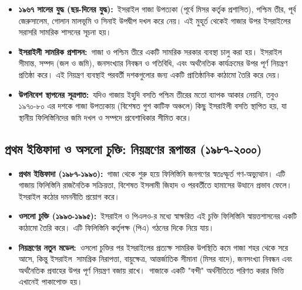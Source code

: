 \begin{itemize}
\item
  \textbf{১৯৬৭ সালের যুদ্ধ (ছয়-দিনের যুদ্ধ):}~ইসরাইল গাজা উপত্যকা (পূর্বে মিসর কর্তৃক প্রশাসিত), পশ্চিম তীর, পূর্ব জেরুসালেম, গোলান মালভূমি ও সিনাই উপদ্বীপ দখল করে নেয়। এই মুহূর্ত থেকেই গাজার উপর ইসরাইলের সরাসরি সামরিক শাসনের সূচনা হয়।
\item
  \textbf{ইসরাইলী সামরিক প্রশাসন:}~গাজা ও পশ্চিম তীরে একটি সামরিক সরকার ব্যবস্থা চালু করা হয়। ইসরাইল সীমান্ত, সম্পদ (জল ও জমি), জনসংখ্যার নিবন্ধন ও গতিবিধি, এবং অর্থনৈতিক কার্যক্রমের উপর পূর্ণ নিয়ন্ত্রণ প্রতিষ্ঠা করে। এই নিয়ন্ত্রণ ব্যবস্থাই পরবর্তী দশকগুলোর জন্য একটি প্রাতিষ্ঠানিক কাঠামো তৈরি করে দেয়।
\item
  \textbf{উপনিবেশ স্থাপনের সূত্রপাত:}~যদিও গাজায় ইহুদি বসতি পশ্চিম তীরের মতো ব্যাপক আকার নেয়নি, তবুও ১৯৭০-৮০ এর দশকে গাজা উপত্যকায় (বিশেষত গুশ কাটিফ অঞ্চলে) কিছু ইসরাইলী বসতি স্থাপিত হয়, যা স্থানীয় ফিলিস্তিনিদের জমি দখল ও সম্পদে প্রবেশাধিকার সীমিত করে।
\end{itemize}
\vspace{0.3em}


\subsection{প্রথম ইন্তিফাদা ও অসলো চুক্তি: নিয়ন্ত্রণের রূপান্তর
(১৯৮৭-২০০০)}\label{ux9aaux9b0ux9a5ux9ae-ux987ux9a8ux9a4ux9abux9a6-ux993-ux993ux9b8ux9b2-ux99aux995ux9a4-ux9a8ux9afux9a8ux9a4ux9b0ux9a3ux9b0-ux9b0ux9aaux9a8ux9a4ux9b0-ux9e7ux9efux9eeux9ed-ux9e8ux9e6ux9e6ux9e6}

\begin{itemize}
\item
  \textbf{প্রথম ইন্তিফাদা (১৯৮৭-১৯৯৩):}~গাজা থেকে শুরু হয়ে ফিলিস্তিনি জনগণের
  স্বতঃস্ফূর্ত গণ-অভ্যুত্থান। এটি গাজায় ফিলিস্তিনি রাজনৈতিক সক্রিয়তা, বিশেষত
  ইসলামী জিহাদ ও পরবর্তীতে হামাসের উত্থানে প্রভাব ফেলে। ইসরাইল কঠোর দমননীতি
  প্রয়োগ করে।
\item
  \textbf{ওসলো চুক্তি (১৯৯৩-১৯৯৫):}~ইসরাইল ও পিএলও-র মধ্যে স্বাক্ষরিত এই চুক্তি
  ফিলিস্তিনি স্বায়ত্তশাসনের একটি কাঠামো তৈরি করে। এটি ফিলিস্তিনি কর্তৃপক্ষ
  (পিএ) গঠনের দিকে নিয়ে যায়।
\item
  \textbf{নিয়ন্ত্রণের নতুন মডেল:}~ওসলো চুক্তির পর ইসরাইলের প্রত্যক্ষ সামরিক
  উপস্থিতি কমে গাজা শহর থেকে সরে আসে, কিন্তু ইসরাইল\textbf{~}সামগ্রিক
  নিরাপত্তা, বায়ুক্ষেত্র, আন্তর্জাতিক সীমানা (মিসর বাদে), জনসংখ্যা নিবন্ধন এবং
  অর্থনৈতিক প্রবাহের উপর পূর্ণ নিয়ন্ত্রণ বজায় রাখে।~গাজাকে একটি "বন্দী"
  অর্থনীতিতে পরিণত করার ভিত্তি এখানেই পাকাপোক্ত হয়।
\end{itemize}
\vspace{0.3em}


